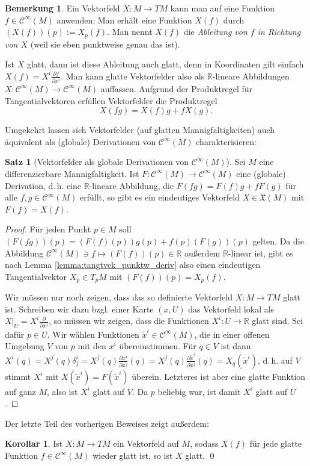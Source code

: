 \documentclass[a4paper]{scrbook}
\numberwithin{equation}{chapter}
\newcommand{\R}{\mathbb{R}}
\newcommand{\sC}{\mathcal{C}^{\infty}}
\theoremstyle{definition}
\newtheorem{satz}[defn]{Satz}
\newtheorem{kor}[defn]{Korollar}
\newtheorem{bem}[defn]{Bemerkung}
\begin{document}
\begin{bem}
	Ein Vektorfeld $X\colon M \to TM$ kann man auf eine Funktion $f\in\sC(M)$ anwenden: Man erhält eine Funktion $X(f)$ durch $(X(f))(p) := X_p(f)$. Man nennt $X(f)$ die \emph{Ableitung von $f$ in Richtung von $X$} (weil sie eben punktweise genau das ist).

	Ist $X$ glatt, dann ist diese Ableitung auch glatt, denn in Koordinaten gilt einfach $X(f) = X^i \frac{\partial f}{\partial x^i}$. Man kann glatte Vektorfelder also als $\R$-lineare Abbildungen $X\colon \sC(M) \to \sC(M)$ auffassen. Aufgrund der Produktregel für Tangentialvektoren erfüllen Vektorfelder die Produktregel
	\[X(fg) = X(f) g + f X(g).\]
\end{bem}
Umgekehrt lassen sich Vektorfelder (auf glatten Mannigfaltigkeiten) auch äquivalent als (globale) Derivationen von $\sC(M)$ charakterisieren:
\begin{satz}[Vektorfelder als globale Derivationen von $\sC(M)$]\label{satz:Vektorfelder_globale_Deriv}
	Sei $M$ eine differenzierbare Mannigfaltigkeit. Ist $F\colon \sC(M) \to \sC(M)$ eine (globale) Derivation, d.\,h. eine $\R$-lineare Abbildung, die $F(fg) = F(f) g + f F(g)$ für alle $f,g \in \sC(M)$ erfüllt, so gibt es ein eindeutiges Vektorfeld $X \in \mathfrak X(M)$ mit $F(f) = X(f)$.

	\begin{proof}
		Für jeden Punkt $p \in M$ soll $(F(fg))(p) = (F(f)(p)) g(p) + f(p) (F(g))(p)$ gelten. Da die Abbildung $\sC(M) \ni f \mapsto (F(f))(p) \in \mathbb R$ außerdem $\R$-linear ist, gibt es nach Lemma \ref{lemma:tangtvek_punktw_deriv} also einen eindeutigen Tangentialvektor $X_p \in T_pM$ mit $(F(f))(p) = X_p(f)$.

		Wir müssen nur noch zeigen, dass das so definierte Vektorfeld $X\colon M \to TM$ glatt ist. Schreiben wir dazu bzgl. einer Karte $(x,U)$ das Vektorfeld lokal als $X|_U = X^i \frac{\partial}{\partial x^i}$, so müssen wir zeigen, dass die Funktionen $X^i \colon U \to \mathbb R$ glatt sind. Sei dafür $p \in U$. Wir wählen Funktionen $\tilde x^i \in \sC(M)$, die in einer offenen Umgebung $V$ von $p$ mit den $x^i$ übereinstimmen. Für $q \in V$ ist dann $X^i(q) = X^j(q) \delta^i_j = X^j(q) \frac{\partial x^i}{\partial x^j}(q) = X^j(q) \frac{\partial \tilde x^i}{\partial x^j}(q) = X_q (\tilde x^i)$, d.\,h. auf $V$ stimmt $X^i$ mit $X(\tilde x^i) = F(\tilde x^i)$ überein. Letzteres ist aber eine glatte Funktion auf ganz $M$, also ist $X^i$ glatt auf $V$. Da $p$ beliebig war, ist damit $X^i$ glatt auf $U$.
	\end{proof}
\end{satz}
Der letzte Teil des vorherigen Beweises zeigt außerdem:
\begin{kor}
	Ist $X\colon M \to TM$ ein Vektorfeld auf $M$, sodass $X(f)$ für jede glatte Funktion $f \in \sC(M)$ wieder glatt ist, so ist $X$ glatt. \qed
\end{kor}
\end{document}
